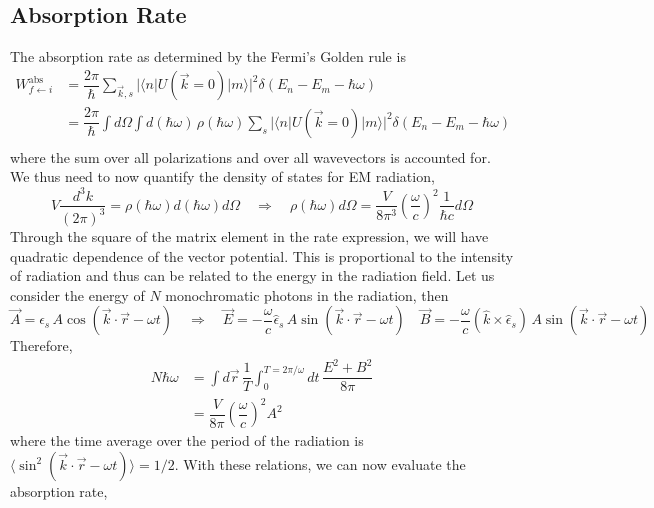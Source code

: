 \documentclass[aps,prb,onecolumn,notitlepage,showpacs,floatfix,superscriptaddress]{revtex4-1}
\newcommand{\mrm}[1]{\mathrm{#1}}
\begin{document}
\subsection{Absorption Rate}
The absorption rate as determined by the Fermi's Golden rule is
\begin{equation}
\begin{split}
W^\mrm{abs}_{f \leftarrow i} &= \dfrac{2\pi}{\hbar} \sum_{\vec{k},s} \vert \langle n \vert U(\vec{k} = 0) \vert m \rangle \vert^2 \delta \left( E_n-E_m-\hbar\omega\right) \\
&=  \dfrac{2\pi}{\hbar} \int d\Omega \int d(\hbar\omega)\, \rho(\hbar\omega) \sum_s \vert \langle n \vert U(\vec{k} = 0) \vert m \rangle \vert^2 \delta \left( E_n-E_m-\hbar\omega\right) \\
\end{split}
\end{equation}
where the sum over all polarizations and over all wavevectors is accounted for. We thus need to now quantify the density of states for EM radiation,
\begin{equation}
V \dfrac{d^3k}{(2\pi)^3} = \rho(\hbar\omega) d(\hbar\omega) d\Omega \quad \Rightarrow \quad \rho(\hbar\omega) d\Omega = \dfrac{V}{8\pi^3} \left( \dfrac{\omega}{c}\right)^2 \dfrac{1}{\hbar c} d\Omega
\end{equation}
Through the square of the matrix element in the rate expression, we will have quadratic dependence of the vector potential. This is proportional to the intensity of radiation and thus can be related to the energy in the radiation field. Let us consider the energy of $N$ monochromatic photons in the radiation, then
\begin{equation}
\vec{A} = \hat{\epsilon}_s \, A \cos(\vec{k}\cdot\vec{r}-\omega t) \quad \Rightarrow \quad \vec{E} = -\dfrac{\omega}{c} \hat{\epsilon}_s \, A \sin(\vec{k}\cdot\vec{r}-\omega t) \quad \vec{B} = -\dfrac{\omega}{c}  (\hat{k}\times\hat{\epsilon}_s) \, A \sin(\vec{k}\cdot\vec{r}-\omega t)
\end{equation}
Therefore,
\begin{equation}
\begin{split}
N\hbar\omega &= \int d\vec{r} \, \dfrac{1}{T} \int_0^{T=2\pi/\omega} dt \, \dfrac{E^2+B^2}{8\pi} \\
&= \dfrac{V}{8\pi} \left( \dfrac{\omega}{c}\right)^2 A^2 
\end{split}
\end{equation}
where the time average over the period of the radiation is $\langle \sin^2(\vec{k}\cdot\vec{r}-\omega t) \rangle = 1/2$. With these relations, we can now evaluate the absorption rate,
\end{document}
